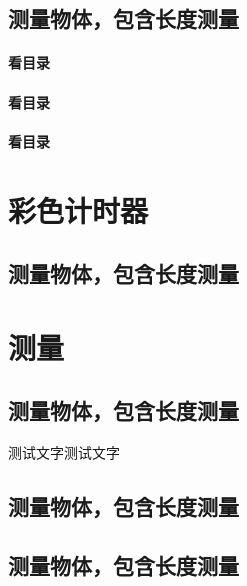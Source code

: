 \begin{Appendix*}

\section{测量物体，包含长度测量}

\subsubsection{看目录}

\subsubsection{看目录}

\subsubsection*{看目录}

\chapter{彩色计时器}

\section{测量物体，包含长度测量}

\chapter{测量}

\zhlipsum[1]

\section{测量物体，包含长度测量}

\begin{Example}
	测试文字测试文字
\end{Example}


\section{测量物体，包含长度测量}

\section{测量物体，包含长度测量}



\end{Appendix*}




